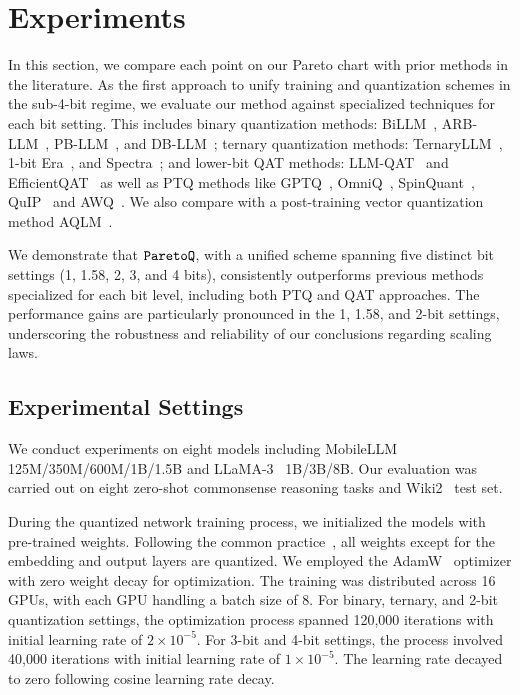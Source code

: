 \section{Experiments}
\label{sec:experiments}
In this section, we compare each point on our Pareto chart with prior methods in the literature. As the first approach to unify training and quantization schemes in the sub-4-bit regime, we evaluate our method against specialized techniques for each bit setting. This includes binary quantization methods: BiLLM~\cite{huang2024billm}, ARB-LLM~\cite{li2024arb}, PB-LLM~\cite{shang2023pb}, and DB-LLM~\cite{chen2024db}; ternary quantization methods: TernaryLLM~\cite{chen2024ternaryllm}, 1-bit Era~\cite{ma2024era}, and Spectra~\cite{kaushal2024spectra}; and lower-bit QAT methods: LLM-QAT~\cite{liu2023llmqat} and EfficientQAT~\cite{chen2024efficientqat} as well as PTQ methods like GPTQ~\cite{frantar2022gptq}, OmniQ~\cite{shao2023omniquant}, SpinQuant~\cite{liu2024spinquant}, QuIP~\cite{chee2024quip} and AWQ~\cite{lin2023awq}. We also compare with a post-training vector quantization method AQLM~\cite{egiazarian2024aqlm}.

We demonstrate that $\texttt{ParetoQ}$, with a unified scheme spanning five distinct bit settings (1, 1.58, 2, 3, and 4 bits), consistently outperforms previous methods specialized for each bit level, including both PTQ and QAT approaches. The performance gains are particularly pronounced in the 1, 1.58, and 2-bit settings, underscoring the robustness and reliability of our conclusions regarding scaling laws.




\subsection{Experimental Settings}
We conduct experiments on eight models including MobileLLM~\cite{liu2024mobilellm} 125M/350M/600M/1B/1.5B and LLaMA-3~\citep{llama3modelcard} 1B/3B/8B. Our evaluation was carried out on eight zero-shot commonsense reasoning tasks and Wiki2~\cite{merity2016wiki2} test set. 

During the quantized network training process, we initialized the models with pre-trained weights. Following the common practice~\cite{frantar2022gptq,liu2023llmqat}, all weights except for the embedding and output layers are quantized. We employed the AdamW~\cite{loshchilov2017decoupled} optimizer with zero weight decay for optimization. The training was distributed across 16 GPUs, with each GPU handling a batch size of 8. For binary, ternary, and 2-bit quantization settings, the optimization process spanned 120,000 iterations with initial learning rate of \(2 \times 10^{-5}\). For 3-bit and 4-bit settings, the process involved 40,000 iterations with initial learning rate of \(1 \times 10^{-5}\). The learning rate decayed to zero following cosine learning rate decay.

